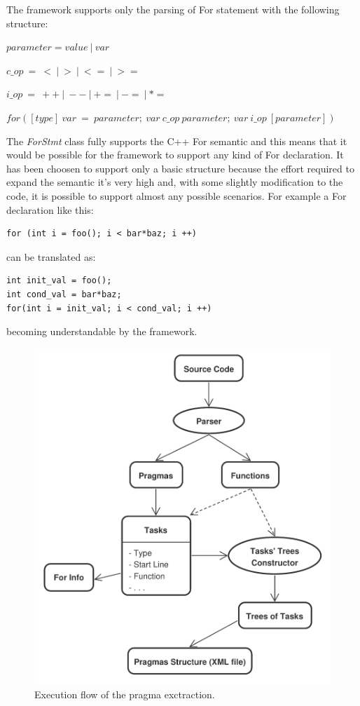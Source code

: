 \documentclass[a4paper,12pt,oneside]{book}
\begin{document}
The framework supports only the parsing of For statement with the following structure: \newline

$parameter = value \ | \ var$

$c\_op \ = \ < \ | \ > \ | \ <= \ | \ >= $

$i\_op \ = \ ++ \ | \ -- \ | \ += \ | \ -= \ | \ *=$ 

$for([type] \ var \ = \ parameter; \ var \ c\_op \ parameter; \ var \ i\_op \ [parameter])$ \newline


The \emph{ForStmt} class fully supports the C++ For semantic and this means that it would be possible for the framework to support any kind of For declaration. It has been choosen to support only a basic structure because the effort required to expand the semantic it’s very high and, with some slightly modification to the code, it is possible to support almost any possible scenarios. For example a For declaration like this: \\

\begin{lstlisting}[language=CCC]
for (int i = foo(); i < bar*baz; i ++)
\end{lstlisting} 
can be translated as: \\

\begin{lstlisting}[language=CCC]
int init_val = foo();
int cond_val = bar*baz;
for(int i = init_val; i < cond_val; i ++)  
\end{lstlisting}
becoming understandable by the framework.

\begin{figure}
\centering
\includegraphics[scale=0.5]{pragma_exctraction.pdf}
\caption{Execution flow of the pragma exctraction.}
\end{figure}
\end{document}
